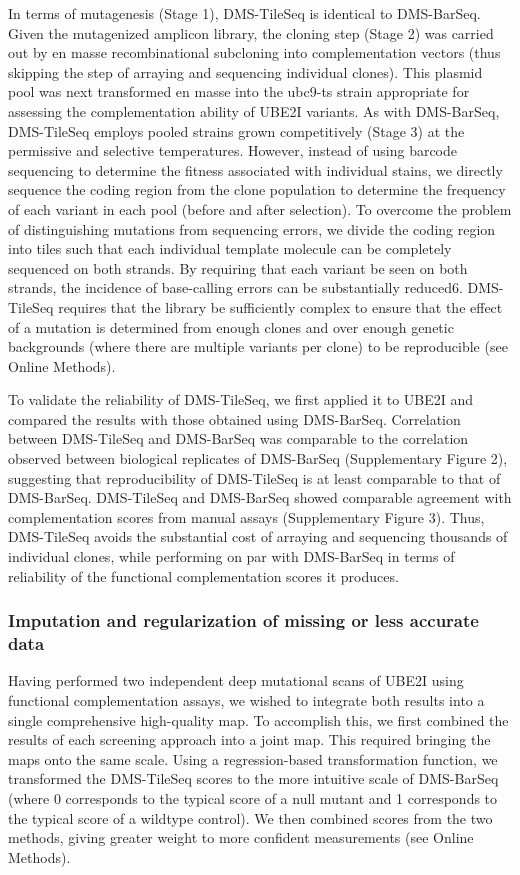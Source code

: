 In terms of mutagenesis (Stage 1), DMS-TileSeq is identical to DMS-BarSeq.  Given the mutagenized amplicon library, the cloning step (Stage 2) was carried out by en masse recombinational subcloning into complementation vectors (thus skipping the step of arraying and sequencing individual clones).  This plasmid pool was next transformed en masse into the ubc9-ts strain appropriate for assessing the complementation ability of UBE2I variants. As with DMS-BarSeq, DMS-TileSeq employs pooled strains grown competitively (Stage 3) at the permissive and selective temperatures. However, instead of using barcode sequencing to determine the fitness associated with individual stains, we directly sequence the coding region from the clone population to determine the frequency of each variant in each pool (before and after selection). To overcome the problem of distinguishing mutations from sequencing errors, we divide the coding region into tiles such that each individual template molecule can be completely sequenced on both strands.  By requiring that each variant be seen on both strands, the incidence of base-calling errors can be substantially reduced6.  DMS-TileSeq requires that the library be sufficiently complex to ensure that the effect of a mutation is determined from enough clones and over enough genetic backgrounds (where there are multiple variants per clone) to be reproducible (see Online Methods).

To validate the reliability of DMS-TileSeq, we first applied it to UBE2I and compared the results with those obtained using DMS-BarSeq. Correlation between DMS-TileSeq and DMS-BarSeq was comparable to the correlation observed between biological replicates of DMS-BarSeq (Supplementary Figure 2), suggesting that reproducibility of DMS-TileSeq is at least comparable to that of DMS-BarSeq. DMS-TileSeq and DMS-BarSeq showed comparable agreement with complementation scores from manual assays (Supplementary Figure 3).  Thus, DMS-TileSeq avoids the substantial cost of arraying and sequencing thousands of individual clones, while performing on par with DMS-BarSeq in terms of reliability of the functional complementation scores it produces.


\subsubsection{Imputation and regularization of missing or less accurate data}

Having performed two independent deep mutational scans of UBE2I using functional complementation assays, we wished to integrate both results into a single comprehensive high-quality map. To accomplish this, we first combined the results of each screening approach into a joint map.  This required bringing the maps onto the same scale. Using a regression-based transformation function, we transformed the DMS-TileSeq scores to the more intuitive scale of DMS-BarSeq (where 0 corresponds to the typical score of a null mutant and 1 corresponds to the typical score of a wildtype control). We then combined scores from the two methods, giving greater weight to more confident measurements (see Online Methods).

